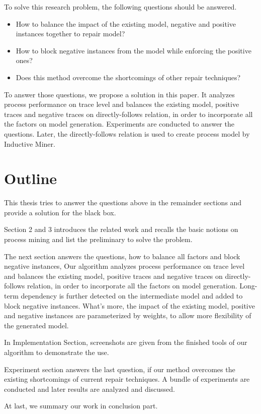 To solve this research problem, the following questions should be answered. 
\begin{itemize}
	\item How to balance the impact of the existing model, negative and positive instances together to repair model? 
	\item How to block negative instances from the model while enforcing the positive ones?
	\item Does this method overcome the shortcomings of other repair techniques? 
\end{itemize}


To answer those questions, we propose a solution in this paper. It analyzes process performance on trace level and balances the existing model, positive traces and negative traces on directly-follows relation, in order to incorporate all the factors on model generation. Experiments are conducted to answer the questions.  
Later, the directly-follows relation is used to create process model by Inductive Miner. 


\section{Outline}
This thesis tries to answer the questions above in the remainder sections and provide a solution for the black box. 

Section 2 and 3 introduces the related work and recalls the basic notions on process mining and list the preliminary to solve the problem. 

The next section answers the questions, how to balance all factors and block negative instances, Our algorithm analyzes process performance on trace level and balances the existing model, positive traces and negative traces on directly-follows relation, in order to incorporate all the factors on model generation. Long-term dependency is further detected on the intermediate model and added to block negative instances. What's more, the impact of the existing model, positive and negative instances are parameterized by weights, to allow more flexibility of the generated model.

In Implementation Section, screenshots are given from the finished tools of our algorithm to demonstrate the use. 

Experiment section answers the last question, if our method overcomes the existing shortcomings of current repair techniques. A bundle of experiments are conducted and later results are analyzed and discussed. 

At last, we summary our work in conclusion part. 

%